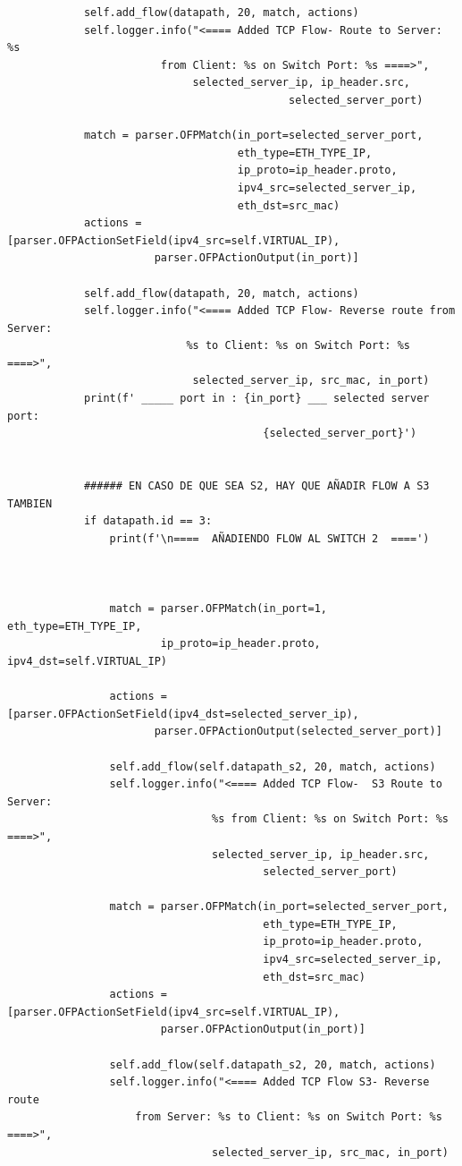 \documentclass[a4paper,12pt]{article}
\begin{document}
\begin{verbatim}
            self.add_flow(datapath, 20, match, actions)
            self.logger.info("<==== Added TCP Flow- Route to Server: %s 
                        from Client: %s on Switch Port: %s ====>",
                             selected_server_ip, ip_header.src, 
                                            selected_server_port)
    
            match = parser.OFPMatch(in_port=selected_server_port, 
                                    eth_type=ETH_TYPE_IP,
                                    ip_proto=ip_header.proto,
                                    ipv4_src=selected_server_ip,
                                    eth_dst=src_mac)
            actions = [parser.OFPActionSetField(ipv4_src=self.VIRTUAL_IP),
                       parser.OFPActionOutput(in_port)]
    
            self.add_flow(datapath, 20, match, actions)
            self.logger.info("<==== Added TCP Flow- Reverse route from Server: 
                            %s to Client: %s on Switch Port: %s ====>",
                             selected_server_ip, src_mac, in_port)
            print(f' _____ port in : {in_port} ___ selected server port: 
                                        {selected_server_port}')
            
    
            ###### EN CASO DE QUE SEA S2, HAY QUE AÑADIR FLOW A S3 TAMBIEN
            if datapath.id == 3:
                print(f'\n====  AÑADIENDO FLOW AL SWITCH 2  ====')
                
    
                
                match = parser.OFPMatch(in_port=1, eth_type=ETH_TYPE_IP, 
                        ip_proto=ip_header.proto, ipv4_dst=self.VIRTUAL_IP)
    
                actions = [parser.OFPActionSetField(ipv4_dst=selected_server_ip),
                       parser.OFPActionOutput(selected_server_port)]
    
                self.add_flow(self.datapath_s2, 20, match, actions)
                self.logger.info("<==== Added TCP Flow-  S3 Route to Server: 
                                %s from Client: %s on Switch Port: %s ====>",
                                selected_server_ip, ip_header.src, 
                                        selected_server_port)
    
                match = parser.OFPMatch(in_port=selected_server_port, 
                                        eth_type=ETH_TYPE_IP,
                                        ip_proto=ip_header.proto,
                                        ipv4_src=selected_server_ip,
                                        eth_dst=src_mac)
                actions = [parser.OFPActionSetField(ipv4_src=self.VIRTUAL_IP),
                        parser.OFPActionOutput(in_port)]
    
                self.add_flow(self.datapath_s2, 20, match, actions)
                self.logger.info("<==== Added TCP Flow S3- Reverse route 
                    from Server: %s to Client: %s on Switch Port: %s ====>",
                                selected_server_ip, src_mac, in_port)
    
\end{verbatim}
\end{document}
